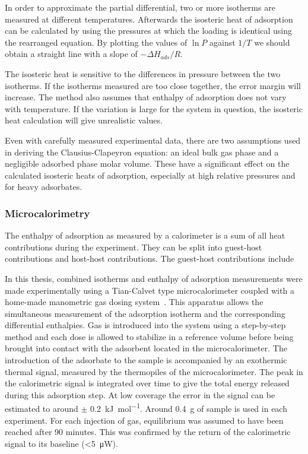 In order to approximate the partial differential, two or more
isotherms are measured at different temperatures. 
Afterwards the isosteric heat of adsorption can be calculated
by using the pressures at which the loading is identical using the 
rearranged equation. By plotting the values of \(\ln P\) against
\(1 / T\) we should obtain a straight line with a slope
of \(- \Delta H_{ads} / R\).

The isosteric heat is sensitive to the differences in pressure between
the two isotherms. If the isotherms measured are too close together, 
the error margin will increase. The method also assumes that enthalpy 
of adsorption does not vary with temperature. If the
variation is large for the system in question, the isosteric
heat calculation will give unrealistic values.

Even with carefully measured experimental data, there are two 
assumptions used in deriving the Clausius-Clapeyron equation: 
an ideal bulk gas phase and a negligible adsorbed phase
molar volume. These have a significant effect on the calculated 
isosteric heats of adsorption, especially at high relative pressures 
and for heavy adsorbates.

\subsubsection{Microcalorimetry}


The enthalpy of adsorption as measured by a calorimeter is a 
sum of all heat contributions during the experiment. They can 
be split into guest-host contributions and host-host contributions.
The guest-host contributions include 

In this thesis, combined isotherms and enthalpy of adsorption
measurements were made experimentally using a Tian-Calvet type
microcalorimeter coupled with a home-made manometric gas dosing
system~\cite{llewellynGasAdsorptionMicrocalorimetry2005}. 
This apparatus allows the simultaneous measurement 
of the adsorption isotherm and the corresponding differential 
enthalpies. Gas is introduced into the system using a step-by-step
method and each dose is allowed to stabilize in a
reference volume before being brought into contact with the
adsorbent located in the microcalorimeter. The introduction of the
adsorbate to the sample is accompanied by an exothermic thermal signal,
measured by the thermopiles of the microcalorimeter. The peak in the
calorimetric signal is integrated over time 
to give the total energy released during this adsorption step.
At low coverage the error in the signal can be estimated to around 
\( \pm \) \SI{0.2} {\kilo\joule\per\mol}. Around \SI{0.4}{\gram} of 
sample is used in each experiment. 
For each injection of gas, equilibrium was assumed to have
been reached after 90 minutes. This was confirmed by the return
of the calorimetric signal to its baseline (<\SI{5}{\micro\watt}).

